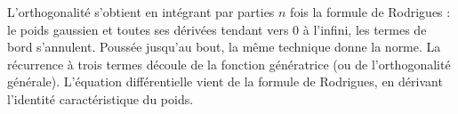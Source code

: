 \decsep{}


\begin{ideepreuve}
L'orthogonalité s'obtient en intégrant par parties $n$ fois la formule de
Rodrigues : le poids gaussien et toutes ses dérivées tendant vers $0$ à
l'infini, les termes de bord s'annulent. Poussée jusqu'au bout, la même
technique donne la norme. La récurrence à trois termes découle de la
fonction génératrice (ou de l'orthogonalité générale). L'équation
différentielle vient de la formule de Rodrigues, en dérivant l'identité
caractéristique du poids.
\end{ideepreuve}

\vspace{10pt}

